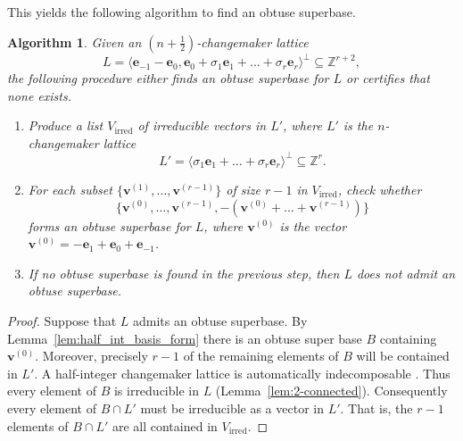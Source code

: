 \documentclass{amsart} %
\newcommand{\Z}{\mathbb{Z}}
\newcommand{\e}{\bm{e}}
\newcommand{\bv}{\bm{v}}
\theoremstyle{thm}
\newtheorem{alg}[Theorem]{Algorithm}
\theoremstyle{definition}
\numberwithin{equation}{section}
\begin{document}
This yields the following algorithm to find an obtuse superbase.
\begin{alg}\label{alg:half_int_OSB}
Given an $(n+\frac12)$-changemaker lattice
\[
L=\langle \e_{-1}-\e_0 , \e_0 + \sigma_1 \e_1 + \dots + \sigma_r \e_r \rangle^\perp \subseteq \Z^{r+2},
\]
the following procedure either finds an obtuse superbase for $L$ or certifies that none exists.
    \begin{enumerate}
        \item Produce a list $V_{\mathrm{irred}}$ of irreducible vectors in $L'$, where
        $L'$ is the $n$-changemaker lattice
\[
L'=\langle \sigma_1 \e_1 + \dots + \sigma_r \e_r \rangle^\bot \subseteq \Z^r. 
\]
        \item For each subset $\{\bv^{(1)},\dots, \bv^{(r-1)}\}$ of size $r-1$ in $V_{\mathrm{irred}}$, check whether 
        \[
        \{\bv^{(0)}, \dots, \bv^{(r-1)}, -(\bv^{(0)} + \dots + \bv^{(r-1)}) \}
        \]
        forms an obtuse superbase for $L$, where $\bv^{(0)}$ is the vector $\bv^{(0)}=-\e_1+\e_0 + \e_{-1}$.
        \item If no obtuse superbase is found in the previous step, then $L$ does not admit an obtuse superbase.
    \end{enumerate}
\end{alg}
\begin{proof}
Suppose that $L$ admits an obtuse superbase. By Lemma~\ref{lem:half_int_basis_form} there is an obtuse super base $B$ containing $\bv^{(0)}$. Moreover, precisely $r-1$ of the remaining elements of $B$ will be contained in $L'$. A half-integer changemaker lattice is automatically indecomposable \cite[Lemma~2.10]{McCoyAltUnknotting}. Thus every element of $B$ is irreducible in $L$ (Lemma~\ref{lem:2-connected}). Consequently every element of $B\cap L'$ must be irreducible as a vector in $L'$. That is, the $r-1$ elements of $B\cap L'$ are all contained in $V_{\mathrm{irred}}$.
\end{proof}
\end{document}
